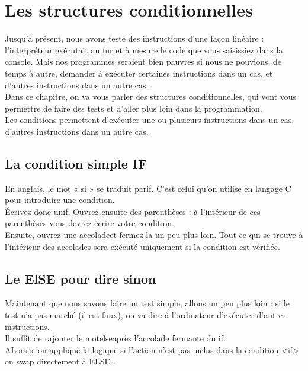\section{Les structures conditionnelles}

Jusqu'à présent, nous avons testé des instructions d'une façon linéaire : l'interpréteur exécutait au fur et à mesure le code que vous saisissiez dans la console. Mais nos programmes seraient bien pauvres si nous ne pouvions, de temps à autre, demander à exécuter certaines instructions dans un cas, et d'autres instructions dans un autre cas.
\\[0.5cm]
Dans ce chapitre, on va vous parler des structures conditionnelles, qui vont vous permettre de faire des tests et d'aller plus loin dans la programmation.
\\[0.5cm]
Les conditions permettent d'exécuter une ou plusieurs instructions dans un cas, d'autres instructions dans un autre cas.
\\[0.5cm]
\subsection{La condition simple IF}

En anglais, le mot « si » se traduit parif. C'est celui qu'on utilise en langage C pour introduire une condition.
\\[0.5cm]
Écrivez donc unif. Ouvrez ensuite des parenthèses : à l'intérieur de ces parenthèses vous devrez écrire votre condition.
\\[0.5cm]
Ensuite, ouvrez une accolade{et fermez-la un peu plus loin}. Tout ce qui se trouve à l'intérieur des accolades sera exécuté uniquement si la condition est vérifiée.
\subsection{Le ElSE pour dire sinon}
Maintenant que nous savons faire un test simple, allons un peu plus loin : si le test n'a pas marché (il est faux), on va dire à l'ordinateur d'exécuter d'autres instructions.
\\[0.5cm]
Il suffit de rajouter le motelseaprès l'accolade fermante du if.
\\[0.5cm]
ALors si on applique la logique si l'action n'est pas inclus dans la condition <if> on swap directement à ELSE .


